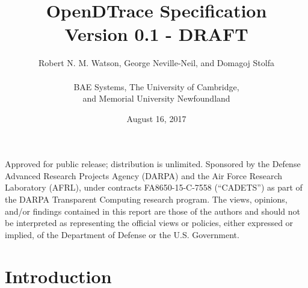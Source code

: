 


\title{OpenDTrace Specification \\
  {\large Version 0.1 - DRAFT}
}

\date{August 16, 2017}

\author{
  Robert N. M. Watson, George Neville-Neil, and Domagoj Stolfa \\
  \\
  BAE Systems, The University of Cambridge, \\
    and Memorial University Newfoundland
}

\begin{minipage}[h]{\textwidth}
  \maketitle

  \vspace{2in}
  {\small
  Approved for public release; distribution is unlimited.
  Sponsored by the Defense Advanced Research Projects Agency (DARPA) and the
  Air Force Research Laboratory (AFRL), under contracts FA8650-15-C-7558
  (``CADETS'') as part of the DARPA Transparent Computing research program.
  The views, opinions, and/or findings contained in this report are those of the
  authors and should not be interpreted as representing the official views or
  policies, either expressed or implied, of the Department of Defense
  or the U.S. Government.}
\end{minipage}

\normalsize



\clearpage



\clearpage



\clearpage

\tableofcontents

\clearpage

\chapter{Introduction}
\label{chap:introduction}


